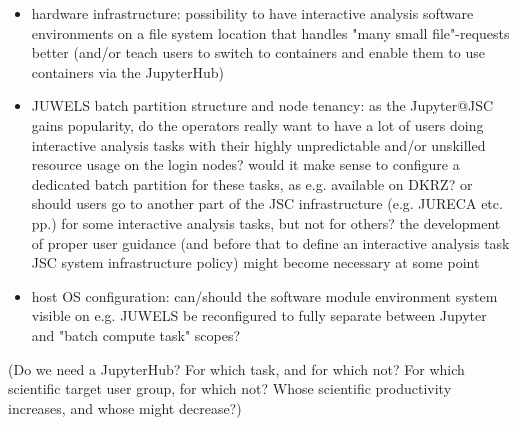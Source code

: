 \begin{itemize}
  \item hardware infrastructure: possibility to have interactive analysis software environments on a file system location that handles "many small file"-requests better (and/or teach users to switch to containers and enable them to use containers via the JupyterHub)
  \item JUWELS batch partition structure and node tenancy: as the Jupyter@JSC gains popularity, do the operators really want to have a lot of users doing interactive analysis tasks with their highly unpredictable and/or unskilled resource usage on the login nodes? would it make sense to configure a dedicated batch partition for these tasks, as e.g. available on DKRZ? or should users go to another part of the JSC infrastructure (e.g. JURECA etc. pp.) for some interactive analysis tasks, but not for others? the development of proper user guidance (and before that to define an interactive analysis task JSC system infrastructure policy) might become necessary at some point
  \item host OS configuration: can/should the software module environment system visible on e.g. JUWELS be reconfigured to fully separate between Jupyter and "batch compute task" scopes?
\end{itemize}

(Do we need a JupyterHub? For which task, and for which not? For which scientific target user group, for which not? Whose scientific productivity increases, and whose might decrease?)
